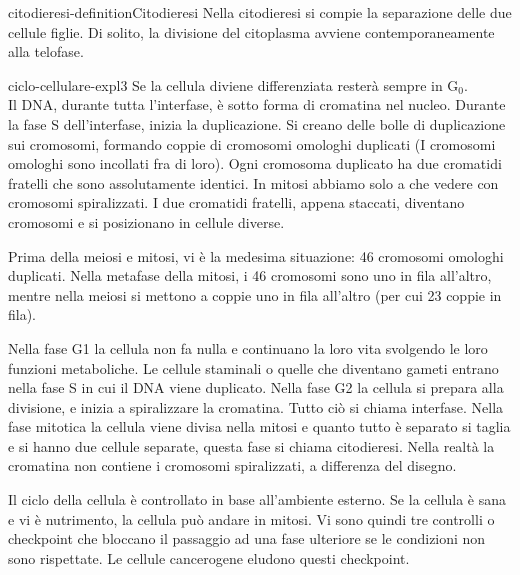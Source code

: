 \documentclass[preview]{standalone}
\begin{document}
\begin{snippetdefinition}{citodieresi-definition}{Citodieresi}
    Nella citodieresi si compie la separazione delle due cellule figlie. Di solito, la divisione del
citoplasma avviene contemporaneamente alla telofase.
\end{snippetdefinition}

\begin{snippet}{ciclo-cellulare-expl3}
    Se la cellula diviene differenziata resterà sempre in G\({}_0\).
    \\
    Il DNA, durante tutta l'interfase, è sotto forma di cromatina nel nucleo.
    Durante la fase S dell'interfase, inizia la duplicazione.
    Si creano delle bolle di duplicazione sui cromosomi, formando
    coppie di cromosomi omologhi duplicati (I cromosomi omologhi sono incollati fra di loro).
    Ogni cromosoma duplicato ha due cromatidi fratelli che sono assolutamente identici.
    In mitosi abbiamo solo a che vedere con cromosomi spiralizzati.
    I due cromatidi fratelli, appena staccati, diventano cromosomi e si posizionano in cellule diverse.

    Prima della meiosi e mitosi, vi è la medesima situazione: 46 cromosomi omologhi duplicati.
    Nella metafase della mitosi, i 46 cromosomi sono uno in fila all'altro,
    mentre nella meiosi si mettono a coppie uno in fila all'altro (per cui 23 coppie in fila).

    Nella fase G1 la cellula non fa nulla e continuano la loro vita svolgendo le loro funzioni metaboliche. 
    Le cellule staminali o quelle che diventano gameti entrano nella fase S in cui il DNA viene duplicato. 
    Nella fase G2 la cellula si prepara alla divisione, e inizia a spiralizzare la cromatina. 
    Tutto ciò si chiama interfase.
    Nella fase mitotica la cellula viene divisa nella mitosi e quanto tutto è separato si taglia e si hanno due cellule separate, questa fase si chiama citodieresi.
    Nella realtà la cromatina non contiene i cromosomi spiralizzati, a differenza del disegno.

    Il ciclo della cellula è controllato in base all'ambiente esterno.
    Se la cellula è sana e vi è nutrimento, la cellula può andare in mitosi.
    Vi sono quindi tre controlli o checkpoint che bloccano il passaggio ad una fase ulteriore
    se le condizioni non sono rispettate.
    Le cellule cancerogene eludono questi checkpoint.
\end{snippet}

\end{document}
